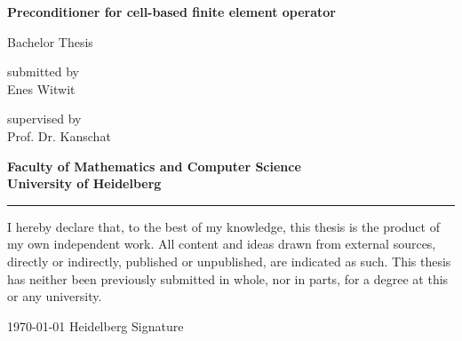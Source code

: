 \documentclass[12pt,a4paper]{scrartcl}
\numberwithin{equation}{section}
\begin{document}
\pagestyle{empty}




\begin{titlepage}

\vspace*{1cm} 
\begin{center} 


\textbf{\Huge Preconditioner for cell-based finite element operator} 
\vspace*{2cm}

{\Large Bachelor Thesis}
\vspace*{1cm}


submitted by \\[0.5cm]

{\Large Enes Witwit}
\vspace*{1cm}

supervised by  \\[0.5cm]
{\Large Prof. Dr. Kanschat}
\vspace*{3cm}

\textbf{
Faculty of Mathematics and Computer Science\\[1cm]
University of Heidelberg}
\end{center}
\end{titlepage}



\newpage
\thispagestyle{empty}
\vspace*{14cm}

\noindent\rule{16cm}{0.4pt}

I hereby declare that, to the best of my knowledge, this thesis is the product of my own independent
work. All content and ideas drawn from external sources, directly or indirectly, published
or unpublished, are indicated as such. This thesis has neither been previously submitted in
whole, nor in parts, for a degree at this or any university. \\[2ex] 

\noindent

\today \hspace*{1cm}  Heidelberg \hspace*{5cm} Signature\\[5ex]



\end{document}
